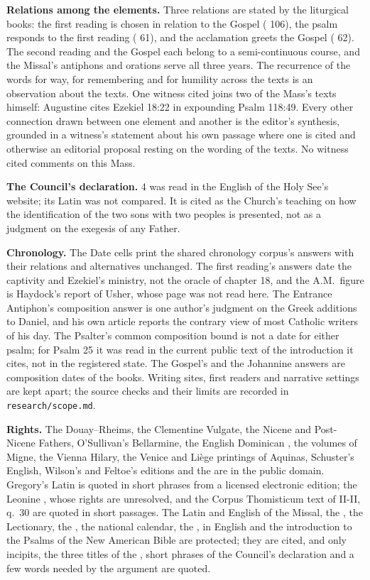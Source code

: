 {\textbf{Relations among the elements.} Three relations are stated by the
liturgical books: the first reading is chosen in relation to the Gospel
( 106), the psalm responds to the first reading
( 61), and the acclamation greets the Gospel
( 62). The second reading and the Gospel each belong
to a semi-continuous course, and the Missal's antiphons and orations serve all
three years. The recurrence of the words for way, for remembering and for
humility across the texts is an observation about the texts. One witness cited
joins two of the Mass's texts himself: Augustine cites Ezekiel 18:22 in
expounding Psalm 118:49. Every other connection drawn between one element and
another is the editor's synthesis, grounded in a witness's statement about his
own passage where one is cited and otherwise an editorial proposal resting on
the wording of the texts. No witness cited comments on this Mass.

\textbf{The Council's declaration.}  4 was read in the
English of the Holy See's website; its Latin was not compared. It is cited as
the Church's teaching on how the identification of the two sons with two
peoples is presented, not as a judgment on the exegesis of any Father.

\textbf{Chronology.} The Date cells print the shared chronology corpus's
answers with their relations and alternatives unchanged. The first reading's
answers date the captivity and Ezekiel's ministry, not the oracle of chapter
18, and the A.M.\ figure is Haydock's report of Usher, whose page was not read
here. The Entrance Antiphon's composition answer is one author's judgment on
the Greek additions to Daniel, and his own article reports the contrary view of
most Catholic writers of his day. The Psalter's common composition bound is
not a date for either psalm; for Psalm 25 it was read in the current public
text of the introduction it cites, not in the registered state. The Gospel's
and the Johannine answers are composition dates of the books. Writing sites,
first readers and narrative settings are kept apart; the source checks and
their limits are recorded in \texttt{research/scope.md}.

\textbf{Rights.} The Douay--Rheims, the Clementine Vulgate, the Nicene and
Post-Nicene Fathers, O'Sullivan's Bellarmine, the English Dominican
, the volumes of Migne, the Vienna Hilary, the Venice and Li\`ege
printings of Aquinas, Schuster's English, Wilson's and Feltoe's editions and
the  are in the public domain. Gregory's Latin is
quoted in short phrases from a licensed electronic edition; the Leonine
, whose rights are unresolved, and the Corpus Thomisticum text of
II-II, q.~30 are quoted in short passages.
The Latin and English of the Missal, the , the
Lectionary, the , the national calendar, the
,  in English and the introduction to the
Psalms of the New American Bible are protected; they are cited, and only
incipits, the three titles of the , short phrases of the Council's
declaration and a few words needed by the argument are quoted.

}
